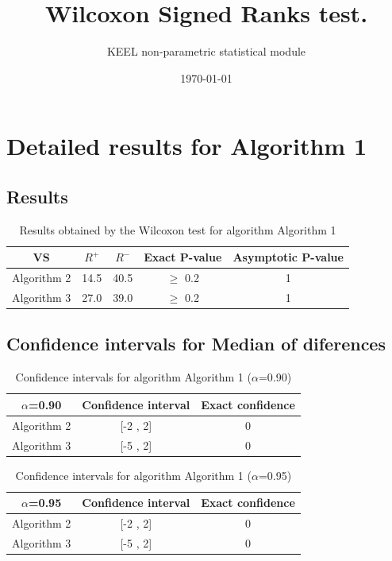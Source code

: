 \documentclass[a4paper,10pt]{article}
\title{Wilcoxon Signed Ranks test.}
\date{\today}
\author{KEEL non-parametric statistical module}
\begin{document}
\pagestyle{empty}
\maketitle
\thispagestyle{empty}



\section{Detailed results for Algorithm 1}


\subsection{Results}

\begin{table}[!htp]
\centering\small
\begin{tabular}{
|c|c|c|c|c|}
\hline
 VS & $R^{+}$ & $R^{-}$ & Exact P-value & Asymptotic P-value \\ \hline 
Algorithm 2 & 14.5 & 40.5 & $\geq$ 0.2 & 1\\ \hline 
Algorithm 3 & 27.0 & 39.0 & $\geq$ 0.2 & 1\\ \hline 

\end{tabular}
\caption{Results obtained by the Wilcoxon test for algorithm Algorithm 1}
\end{table}

\subsection{Confidence intervals for Median of diferences}

\begin{table}[!htp]
\centering\small
\begin{tabular}{
|c|c|c|}
\hline
 $\alpha$=0.90 & Confidence interval & Exact confidence \\ \hline 
Algorithm 2 & [-2 , 2] & 0\\ \hline 
Algorithm 3 & [-5 , 2] & 0\\ \hline 

\end{tabular}
\caption{Confidence intervals for algorithm Algorithm 1 ($\alpha$=0.90)}
\end{table}
\begin{table}[!htp]
\centering\small
\begin{tabular}{
|c|c|c|}
\hline
 $\alpha$=0.95 & Confidence interval & Exact confidence \\ \hline 
Algorithm 2 & [-2 , 2] & 0\\ \hline 
Algorithm 3 & [-5 , 2] & 0\\ \hline 

\end{tabular}
\caption{Confidence intervals for algorithm Algorithm 1 ($\alpha$=0.95)}
\end{table}
\end{document}
